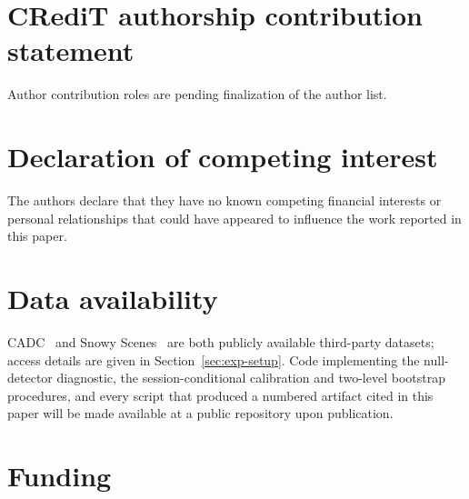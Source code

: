 \section*{CRediT authorship contribution statement}
Author contribution roles are pending finalization of the author list.

\section*{Declaration of competing interest}
The authors declare that they have no known competing financial interests
or personal relationships that could have appeared to influence the work
reported in this paper.

\section*{Data availability}
CADC~\cite{Pitropov2021CADC} and Snowy Scenes~\cite{SnowyScenes2026} are
both publicly available third-party datasets; access details are given in
Section~\ref{sec:exp-setup}. Code implementing the null-detector
diagnostic, the session-conditional calibration and two-level bootstrap
procedures, and every script that produced a numbered artifact cited in
this paper will be made available at a public repository upon publication.

\section*{Funding}
